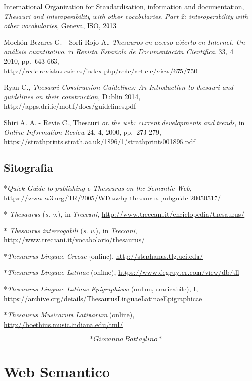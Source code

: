 \documentclass[
  b5paper,
  twoside,
  12pt,
  chapterprefix=false,
  bibliography=totocnumbered,
  parskip=false]{scrbook}
\begin{document}
International Organization for Standardization, information and
documentation, \emph{Thesauri and interoperability with other vocabularies.
Part 2: interoperability with other vocabularies}, Geneva, ISO, 2013

Mochón Bezares G. - Sorli Rojo A., \emph{Thesauros en acceso abierto en
Internet. Un análisis cuantitativo}, in \emph{Revista Española de
Documentación Cientifica}, 33, 4, 2010, pp.~643-663,
\url{http://redc.revistas.csic.es/index.php/redc/article/view/675/750}

Ryan C., \emph{Thesauri Construction Guidelines: An Introduction to thesauri
and guidelines on their construction}, Dublin 2014,
\url{http://apps.dri.ie/motif/docs/guidelines.pdf}

Shiri A. A. - Revie C., Thesauri \emph{on the web: current developments and
trends}, in \emph{Online Information Review} 24, 4, 2000, pp.~273-279,
\url{https://strathprints.strath.ac.uk/1896/1/strathprints001896.pdf}

\hypertarget{sitografia-33}{%
\section*{Sitografia}\label{sitografia-33}}

*\emph{Quick Guide to publishing a Thesaurus on the Semantic Web},
\url{https://www.w3.org/TR/2005/WD-swbp-thesaurus-pubguide-20050517/}

* \emph{Thesaurus} (\emph{s. v.})\emph{,} in \emph{Treccani},
\url{http://www.treccani.it/enciclopedia/thesaurus/}

* \emph{Thesaurus} \emph{interrogabili} (\emph{s. v.})\emph{,} in \emph{Treccani},
\url{http://www.treccani.it/vocabolario/thesaurus/}

*\emph{Thesaurus Linguae Grecae} (online),
\url{http://stephanus.tlg.uci.edu/}

*\emph{Thesaurus Linguae Latinae} (online),
\url{https://www.degruyter.com/view/db/tll}

*\emph{Thesaurus Linguae Latinae Epigraphicae} (online, scaricabile), I,
\url{https://archive.org/details/ThesaurusLinguaeLatinaeEpigraphicae}

*\emph{Thesaurus Musicarum Latinarum} (online),
\url{http://boethius.music.indiana.edu/tml/}

\[*Giovanna~Battaglino*\]

\hypertarget{web-semantico}{%
\chapter{Web Semantico}\label{web-semantico}}
\end{document}
